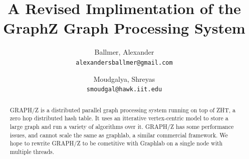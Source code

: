\documentclass[10pt]{article}
\begin{document}
\title{A Revised Implimentation of the GraphZ Graph Processing System}

\author{
  Ballmer, Alexander\\
  \texttt{alexandersballmer@gmail.com}
  \and
  Moudgalya, Shreyas\\
  \texttt{smoudgal@hawk.iit.edu}
  }

\maketitle

\begin{abstract}
  GRAPH/Z is a distributed parallel graph processing system running on top of ZHT, a zero hop distributed hash table. It uses an itterative vertex-centric model to store a large graph and run a variety of algorithms over it. GRAPH/Z has some performance issues, and cannot scale the same as graphlab, a similar commercial framework. We hope to rewrite GRAPH/Z to be cometitive with Graphlab on a single node with multiple threads.
\end{abstract}
\end{document}
